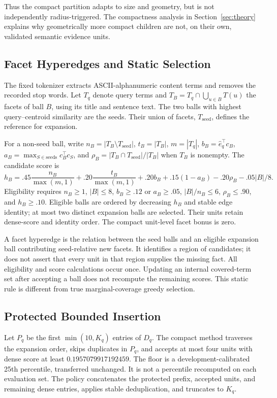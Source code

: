 \documentclass[11pt,a4paper]{article}
\begin{document}
Thus the compact partition adapts to size and geometry, but is not
independently radius-triggered.
The compactness analysis in Section~\ref{sec:theory} explains why geometrically
more compact children are not, on their own, validated semantic evidence units.

\subsection{Facet Hyperedges and Static Selection}
The fixed tokenizer extracts ASCII-alphanumeric content terms and removes
the recorded stop words. Let $T_q$ denote query terms and
$T_B=T_q\cap\bigcup_{u\in B}T(u)$ the facets of ball $B$, using its title and
sentence text. The two balls with highest query--centroid similarity are the
seeds. Their union of facets, $T_{\mathrm{seed}}$, defines the reference for
expansion.

For a non-seed ball, write
$n_B=|T_B\setminus T_{\mathrm{seed}}|$,
$t_B=|T_B|$, $m=|T_q|$,
$b_B=\hat e_q^\top c_B$,
$a_B=\max_{S\in\mathrm{seeds}}c_B^\top c_S$, and
$\rho_B=|T_B\cap T_{\mathrm{seed}}|/|T_B|$ when $T_B$ is nonempty.
The candidate score is
\begin{equation}
h_B=.45\frac{n_B}{\max(m,1)}+.20\frac{t_B}{\max(m,1)}
     +.20b_B+.15(1-a_B)-.20\rho_B-.05|B|/8.
\label{eq:compactscore}
\end{equation}
Eligibility requires $n_B\geq1$, $|B|\leq8$, $b_B\geq.12$ or $a_B\geq.05$,
$|B|/n_B\leq6$, $\rho_B\leq.90$, and $h_B\geq.10$.
Eligible balls are ordered by decreasing $h_B$ and stable edge identity; at
most two distinct expansion balls are selected. Their units retain dense-score
and identity order. The compact unit-level facet bonus is zero.

A facet hyperedge is the relation between the seed balls and an eligible
expansion ball contributing seed-relative new facets. It identifies a region
of candidates; it does not assert that every unit in that region supplies the
missing fact. All eligibility and score calculations occur once. Updating an
internal covered-term set after accepting a ball does not recompute the
remaining scores. This static rule is different from true marginal-coverage
greedy selection.

\subsection{Protected Bounded Insertion}
Let $P_q$ be the first $\min(10,K_q)$ entries of $D_q$. The compact method
traverses the expansion order, skips duplicates in $P_q$, and accepts at most
four units with dense score at least $0.1957079917192459$. The floor is a
development-calibrated 25th percentile, transferred unchanged.
It is not a percentile recomputed on each evaluation set.
The policy concatenates the protected prefix, accepted units, and remaining
dense entries, applies stable deduplication, and truncates to $K_q$.
\end{document}
